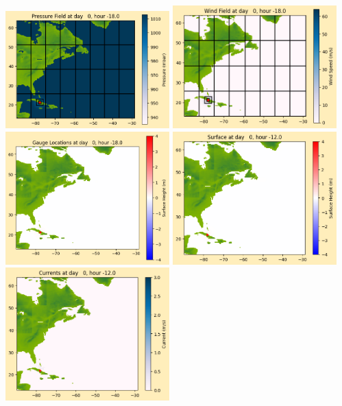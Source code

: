 \documentclass[11pt]{article}
\begin{document}
\includegraphics[width=0.475\textwidth]{frame0009fig1012.png}
\vskip 10pt 
\includegraphics[width=0.475\textwidth]{frame0009fig1013.png}
\includegraphics[width=0.475\textwidth]{frame0009fig1014.png}
\vskip 10pt 
\includegraphics[width=0.475\textwidth]{frame0010fig1001.png}
\includegraphics[width=0.475\textwidth]{frame0010fig1002.png}
\end{document}
